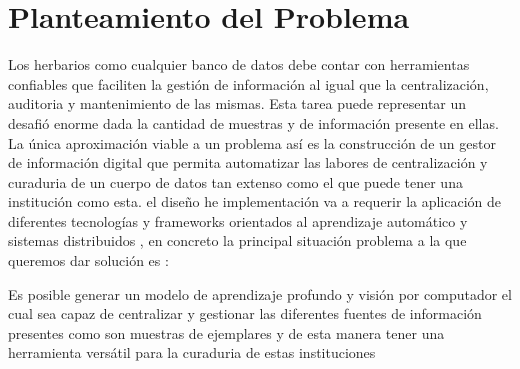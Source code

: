 \chapter{Planteamiento del Problema}

Los herbarios como cualquier banco de datos debe contar con herramientas confiables que faciliten la gestión de información al igual que la centralización, auditoria y mantenimiento de las mismas. Esta tarea puede representar un desafió enorme dada la cantidad de muestras y de información presente en ellas. La única aproximación viable a un problema así es la construcción de un gestor de información digital que permita automatizar las labores de centralización y curaduria de un cuerpo de datos tan extenso como el que puede tener una institución como esta. el diseño he implementación va a requerir la aplicación de diferentes tecnologías y frameworks orientados al aprendizaje automático y sistemas distribuidos , en concreto la principal situación problema a la que queremos dar solución es :

Es posible generar un modelo de aprendizaje profundo y visión por computador el cual sea capaz de centralizar y gestionar las diferentes fuentes de información presentes como son muestras de ejemplares y de esta manera tener una herramienta versátil para la curaduria de estas instituciones 

\clearpage
